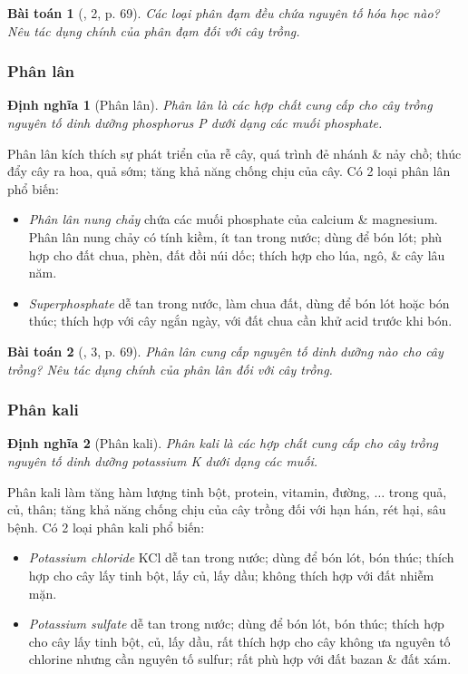 \documentclass{article}
\newtheorem{baitoan}{Bài toán}
\newtheorem{dinhnghia}{Định nghĩa}
\begin{document}
\begin{baitoan}[\cite{SGK_KHTN_8_Canh_Dieu}, 2, p. 69]
	Các loại phân đạm đều chứa nguyên tố hóa học nào? Nêu tác dụng chính của phân đạm đối với cây trồng.
\end{baitoan}

\subsubsection{Phân lân}

\begin{dinhnghia}[Phân lân]
	\emph{Phân lân} là các hợp chất cung cấp cho cây trồng nguyên tố dinh dưỡng phosphorus \emph{P} dưới dạng các muối phosphate.
\end{dinhnghia}
Phân lân kích thích sự phát triển của rễ cây, quá trình đẻ nhánh \& nảy chồ; thúc đẩy cây ra hoa, quả sớm; tăng khả năng chống chịu của cây. Có 2 loại phân lân phổ biến:
\begin{itemize}
	\item \textit{Phân lân nung chảy} chứa các muối phosphate của calcium \& magnesium. Phân lân nung chảy có tính kiềm, ít tan trong nước; dùng để bón lót; phù hợp cho đất chua, phèn, đất đồi núi dốc; thích hợp cho lúa, ngô, \& cây lâu năm.
	\item \textit{Superphosphate}  dễ tan trong nước, làm chua đất, dùng để bón lót hoặc bón thúc; thích hợp với cây ngắn ngày, với đất chua cần khử acid trước khi bón.
\end{itemize}

\begin{baitoan}[\cite{SGK_KHTN_8_Canh_Dieu}, 3, p. 69]
	Phân lân cung cấp nguyên tố dinh dưỡng nào cho cây trồng? Nêu tác dụng chính của phân lân đối với cây trồng.
\end{baitoan}

\subsubsection{Phân kali}

\begin{dinhnghia}[Phân kali]
	\emph{Phân kali} là các hợp chất cung cấp cho cây trồng nguyên tố dinh dưỡng potassium \emph{K} dưới dạng các muối.
\end{dinhnghia}
Phân kali làm tăng hàm lượng tinh bột, protein, vitamin, đường, $\ldots$ trong quả, củ, thân; tăng khả năng chống chịu của cây trồng đối với hạn hán, rét hại, sâu bệnh. Có 2 loại phân kali phổ biến:
\begin{itemize}
	\item \textit{Potassium chloride} KCl dễ tan trong nước; dùng để bón lót, bón thúc; thích hợp cho cây lấy tinh bột, lấy củ, lấy dầu; không thích hợp với đất nhiễm mặn.
	\item \textit{Potassium sulfate}  dễ tan trong nước; dùng để bón lót, bón thúc; thích hợp cho cây lấy tinh bột, củ, lấy dầu, rất thích hợp cho cây không ưa nguyên tố chlorine nhưng cần nguyên tố sulfur; rất phù hợp với đất bazan \& đất xám.
\end{itemize}
\end{document}
